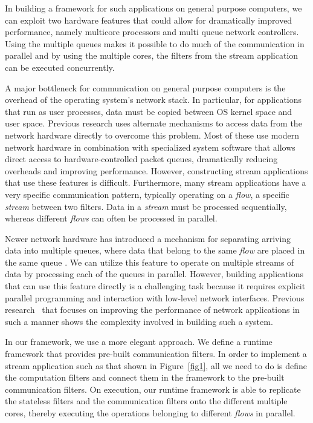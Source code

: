 \documentclass[10pt, conference, compsocconf, reqno]{IEEEtran}
\newcommand{\comment}[1]{}
\begin{document}
In building a framework for such applications on general purpose computers, we can exploit two hardware features that could allow for dramatically improved performance, namely multicore processors and multi queue network controllers. Using the multiple queues makes it possible to do much of the communication in parallel and by using the multiple cores, the filters from the stream application can be executed concurrently.

A major bottleneck for communication on general purpose computers is the overhead of the operating system's network stack. In particular, for applications that run as user processes, data must be copied between OS kernel space and user space. Previous research uses alternate mechanisms to access data from the network hardware directly to overcome this problem\cite{Dobrescu09routebricks:exploiting}\cite{Han:2010:PGS:1851275.1851207}\cite{Kohler2000}. Most of these use modern network hardware in combination with specialized system software that allows direct access to hardware-controlled packet queues, dramatically reducing overheads and improving performance. However, constructing stream applications that use these features is difficult. Furthermore, many stream applications have a very specific communication pattern, typically operating on a \textit{flow}, a specific \textit{stream} between two filters. Data in a \textit{stream} must be processed sequentially, whereas different \textit{flows} can often be processed in parallel.

Newer network hardware has introduced a mechanism for separating arriving data into multiple queues, where data that belong to the same \textit{flow} are\comment{ guaranteed to be} placed in the same queue\cite{micro2008} \cite{intel2010}. We can utilize this feature to operate on multiple streams of data by processing each of the queues in parallel. However, building applications that can use this feature directly is a challenging task because it requires explicit parallel programming and interaction with low-level network interfaces. Previous research~\cite{Dobrescu09routebricks:exploiting,Han:2010:PGS:1851275.1851207} that focuses on improving the performance of network applications in such a manner shows the complexity involved in building such a system.

\comment{We parallelize both the application and packet operations to gain significant improvement in performance.}

In our framework, we use a more elegant approach. We define a runtime framework that provides pre-built communication filters. In order to implement a stream application such as that shown in Figure~\ref{fig1}, all we need to do is define the computation filters and connect them in the framework to the pre-built communication filters. On execution, our runtime framework is able to replicate the stateless filters and the communication filters onto the different multiple cores, thereby executing the operations belonging to different \textit{flows} in parallel.
\end{document}
